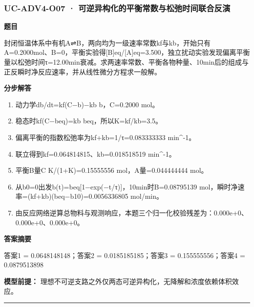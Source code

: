 \documentclass[UTF8,11pt,a4paper]{ctexart}
\begin{document}
\subsubsection*{UC-ADV4-O07 · 可逆异构化的平衡常数与松弛时间联合反演}
\noindent\textbf{题目}\par
封闭恒温体系中有机A⇌B，两向均为一级速率常数kf与kb，开始只有A=0.2000mol、B=0，平衡实验得[B]eq/[A]eq=3.500，独立扰动实验发现偏离平衡量以松弛时间τ=12.00min衰减。求两速率常数、平衡各物种量、10min后的组成与正反瞬时净反应速率，并从线性微分方程求一般解。\par
\medskip\noindent\textbf{分步解答}
\begin{enumerate}
\item 动力学db/dt=kf(C−b)−kb b，C=0.2000 mol。
\item 稳态时kf(C−beq)=kb beq，所以K=kf/kb=3.5。
\item 偏离平衡的指数松弛率为kf+kb=1/τ=0.083333333 min\textasciicircum{}-1。
\item 联立得到kf=0.064814815、kb=0.018518519 min\textasciicircum{}-1。
\item 平衡B量C K/(1+K)=0.15555556 mol，A量=0.044444444 mol。
\item 从b0=0出发b(t)=beq[1−exp(−t/τ)]，10min时B=0.08795139 mol，瞬时净速率=(kf+kb)(beq−b10)=0.0056336805 mol/min。
\item 由反应网络逆算总物料与观测响应，本题三个归一化校验残差为：0.000e+0、0.000e+0、0.000e+0。
\end{enumerate}
\noindent\textbf{答案摘要}\par
答案1 = 0.0648148148；答案2 = 0.0185185185；答案3 = 0.155555556；答案4 = 0.0879513898\par
\noindent\textbf{模型前提：}
理想不可逆支路之外仅两态可逆异构化，无降解和浓度依赖体积效应。\par
\medskip\hrule\medskip
{}
\end{document}
